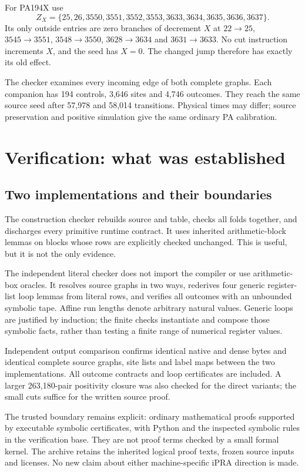 \documentclass[11pt,letterpaper]{article}
\begin{document}
For PA194X use
\[
 Z_X=\{25,26,3550,3551,3552,3553,3633,3634,3635,3636,3637\}.
\]
Its only outside entries are zero branches of decrement $X$ at
$22\to25$, $3545\to3551$, $3548\to3550$, $3628\to3634$ and
$3631\to3633$. No cut instruction increments $X$, and the seed has
$X=0$. The changed jump therefore has exactly its old effect.

The checker examines every incoming edge of both complete graphs.
Each companion has 194 controls, 3,646 sites and 4,746 outcomes.
They reach the same source seed after 57,978 and 58,014 transitions.
Physical times may differ; source preservation and positive simulation
give the same ordinary PA calibration.

\section{Verification: what was established}
\label{sec:verification}

\subsection{Two implementations and their boundaries}

The construction checker rebuilds source and table, checks all folds
together, and discharges every primitive runtime contract. It uses
inherited arithmetic-block lemmas on blocks whose rows are explicitly
checked unchanged. This is useful, but it is not the only evidence.

The independent literal checker does not import the compiler or use
arithmetic-box oracles. It resolves source graphs in two ways, rederives
four generic register-list loop lemmas from literal rows, and verifies
all outcomes with an unbounded symbolic tape. Affine run lengths denote
arbitrary natural values. Generic loops are justified by induction;
the finite checks instantiate and compose those symbolic facts, rather
than testing a finite range of numerical register values.



Independent output comparison confirms identical native and dense
bytes and identical complete source graphs, site lists and label maps
between the two implementations. All outcome contracts and loop
certificates are included. A larger 263,180-pair positivity closure was
also checked for the direct variants; the small cuts suffice for the
written source proof.

The trusted boundary remains explicit: ordinary mathematical proofs
supported by executable symbolic certificates, with Python and the
inspected symbolic rules in the verification base. They are not
proof terms checked by a small formal kernel. The archive retains
the inherited logical proof texts, frozen source inputs and licenses.
No new claim about either machine-specific iPRA direction is made.
\end{document}
